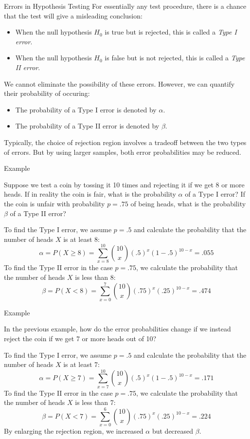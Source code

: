 \documentclass[t,handout]{beamer}
\begin{document}
            \begin{frame}{Errors in Hypothesis Testing}
            For essentially any test procedure, there is a chance that the test will give a misleading conclusion:
            \begin{itemize}
            \pause\item When the null hypothesis $H_0$ is true but is rejected, this is called a \emph{Type I error}.
            \pause\item When the null hypothesis $H_0$ is false but is not rejected, this is called a \emph{Type II error}.
            \end{itemize}
            \pause We cannot eliminate the possibility of these errors. However, we can quantify their probability of occuring:
            \begin{itemize}
            \pause\item The probability of a Type I error is denoted by $\alpha$.
            \pause\item The probability of a Type II error is denoted by $\beta$.
            \end{itemize}
            \pause Typically, the choice of rejection region involves a tradeoff between the two types of errors. \pause But by using larger samples, both error probabilities may be reduced.
            \end{frame}
            \begin{frame}{Example}
\begin{block}{}
Suppose we test a coin by tossing it 10 times and rejecting it if we get 8 or more heads. If in reality the coin is fair, what is the probability $\alpha$ of a Type I error? If the coin is unfair with probability $p=.75$ of being heads, what is the probability $\beta$ of a Type II error?
\end{block}
\pause To find the Type I error, we assume $p=.5$ and calculate the probability that the number of heads $X$ is at least 8:
\pause $$\alpha = P(X \geq 8) = \sum_{x=8}^{10} \binom{10} x (.5)^x(1-.5)^{10-x}= .055$$
\pause To find the Type II error in the case $p=.75$, we calculate the probability that the number of heads $X$ is less than 8:
\pause $$\beta = P(X < 8) = \sum_{x=0}^7 \binom{10} x (.75)^x(.25)^{10-x} = .474$$
\end{frame}

\begin{frame}{Example}
\begin{block}{}
In the previous example, how do the error probabilities change if we instead reject the coin if we get 7 or more heads out of 10?
\end{block}
\pause To find the Type I error, we assume $p=.5$ and calculate the probability that the number of heads $X$ is at least 7:
\pause $$\alpha = P(X \geq 7) = \sum_{x=7}^{10} \binom{10} x (.5)^x(1-.5)^{10-x}= .171$$
\pause To find the Type II error in the case $p=.75$, we calculate the probability that the number of heads $X$ is less than 7:
\pause $$\beta = P(X < 7) = \sum_{x=0}^6 \binom{10} x (.75)^x(.25)^{10-x} = .224$$
By enlarging the rejection region, we increased $\alpha$ but decreased $\beta$.
\end{frame}
\end{document}
